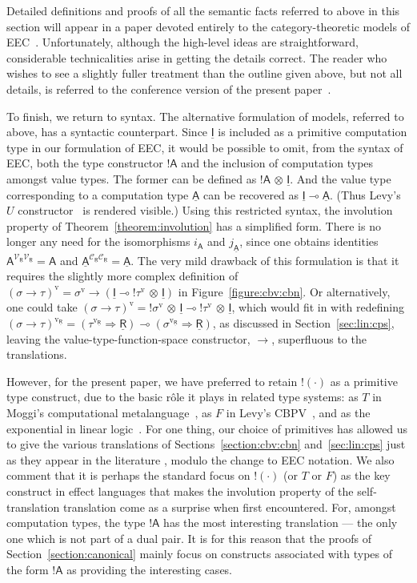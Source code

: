 \documentclass{LMCS}
\newcommand{\comptype}[1]{\underline{#1}}
\newcommand{\VA}{\mathsf{A}}
\newcommand{\CA}{\comptype{\mathsf{A}}}
\newcommand{\CR}{\comptype{\mathsf{R}}}
\newcommand{\CI}{\comptype{\mathsf{I}}}
\newcommand{\Vfun}{\to}
\newcommand{\lpop}{\multimap}
\newcommand{\Cfun}{\Rightarrow}
\newcommand{\Cbang}[1]{{! #1}}
\newcommand{\Ccopower}[2]{! #1 \, {\otimes} \, #2}
\newcommand{\Lfun}{\to}
\newcommand{\cbv}[1]{#1^{\mathrm{v}}}
\newcommand{\cbvLincps}[1]{#1^{\mathrm{v_{\CR}}}}
\newcommand{\CpsVVT}[1]{#1^{\mathcal{V}_{\CR}\mathcal{V}_{\CR}}}
\newcommand{\CpsCCT}[1]{#1^{\mathcal{C}_{\CR}\mathcal{C}_{\CR}}}
\newcommand{\Viso}[1]{i_{#1}}
\newcommand{\Ciso}[1]{j_{#1}}
\begin{document}
Detailed definitions and proofs of 
all the semantic facts referred to above in this section will appear in
a paper devoted entirely to the category-theoretic models of EEC~\cite{EMSc}.
Unfortunately, although  the high-level ideas are straightforward, 
considerable technicalities arise in getting the details correct. 
The reader who wishes to see a slightly fuller treatment
than the outline given above, but not all details, is referred to the conference
version of the present paper~\cite{EMS:fossacs}.

To finish, we return to syntax. The alternative formulation of models, referred to
above, has a syntactic counterpart. Since $\CI$ is included as a primitive
computation type in our formulation of EEC, it would be possible
to omit, from the syntax of EEC, 
both the  type constructor $\Cbang{\VA}$ and the inclusion
of computation types amongst value types. The former can
be defined as $\Ccopower{\VA}{\CI}$. And the  value type corresponding to
a computation type $\CA$ can be recovered as  $\CI \lpop \CA$. (Thus Levy's
$U$ constructor~\cite{Levy:book} is rendered visible.) Using this 
restricted syntax, the involution property of Theorem~\ref{theorem:involution}
has a simplified form. There is no longer any need for the isomorphisms
$\Viso{\VA}$ and $\Ciso{\CA}$, since one obtains identities
$\CpsVVT{\VA} = \VA$ and $\CpsCCT{\CA} = \CA$. 
The very mild drawback of this formulation is that it 
requires the slightly more complex definition of
$\cbv{(\sigma \Lfun \tau)}  = \cbv{\sigma} \Vfun (\CI \lpop {\Ccopower{\cbv{\tau}\!}{\CI}})$
in Figure~\ref{figure:cbv:cbn}. Or alternatively, one could take
$\cbv{(\sigma \Lfun \tau)}  = {\Ccopower{\cbv{\sigma}\!}{\CI}} \lpop {\Ccopower{\cbv{\tau}\!}{\CI}}$,
which would fit in with redefining
$\cbvLincps{(\sigma \Lfun \tau)}  = 
(\cbvLincps{\tau} \Cfun \CR) \lpop (\cbvLincps{\sigma} \Cfun  \CR)$, as
discussed in Section~\ref{sec:lin:cps},
leaving the 
value-type-function-space constructor, $\Vfun$, superfluous to the translations.

However, for the present paper, we have preferred to retain $\Cbang{(\cdot)}$
as a primitive type construct, due to the basic r\^{o}le it plays in
related type systems: as $T$ in Moggi's computational metalanguage~\cite{Moggi:91},
as $F$ in Levy's CBPV~\cite{Levy:book}, and as the exponential in
linear logic~\cite{Girard:87}. For one thing, our choice of primitives
has allowed us to give the various translations of 
Sections~\ref{section:cbv:cbn} and~\ref{sec:lin:cps}
just as they appear in the literature
\cite{Moggi:91,Filinski:phd,Levy:book,Hasegawa:Flops:02,Hasegawa:Flops:04},
modulo the change  to EEC notation.
We also comment that it is perhaps the standard focus on 
$\Cbang{(\cdot)}$ (or $T$ or $F$) as the key construct in effect languages
that makes the involution property of the self-translation translation 
come as a surprise when first encountered. For, amongst computation types,
the type $\Cbang{\VA}$ has the most interesting translation --- the only one which
is not part of a dual pair. It is for this reason that the proofs of
Section~\ref{section:canonical} mainly focus on constructs associated with types of the form
$\Cbang{\VA}$ as providing  the interesting cases.
\end{document}
